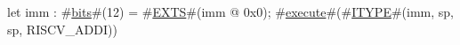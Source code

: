 let imm : #\hyperref[sailRISCVzbits]{bits}#(12) = #\hyperref[sailRISCVzEXTS]{EXTS}#(imm @ 0x0);
#\hyperref[sailRISCVzexecute]{execute}#(#\hyperref[sailRISCVzITYPE]{ITYPE}#(imm, sp, sp, RISCV_ADDI))
